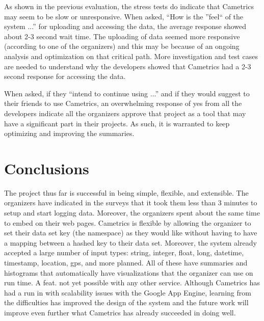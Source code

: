 \documentclass[10pt,a4paper,english]{article}
\begin{document}
As shown in the previous evaluation, the stress tests do indicate that Cametrics may seem to be slow or unresponsive. When asked, ``How is the ''feel`` of the system ...'' for uploading and accessing the data, the average response showed about 2-3 second wait time. The uploading of data seemed more responsive (according to one of the organizers) and this may be because of an ongoing analysis and optimization on that critical path. More investigation and test cases are needed to understand why the developers showed that Cametrics had a 2-3 second response for accessing the data.

When asked, if they ``intend to continue using ...'' and if they would suggest to their friends to use Cametrics, an overwhelming response of yes from all the developers indicate all the organizers approve that project as a tool that may have a significant part in their projects. As such, it is warranted to keep optimizing and improving the summaries.


\pagebreak{}




\hypertarget{conclusions}{}
\section*{Conclusions}
\label{conclusions}

The project thus far is successful in being simple, flexible, and extensible. The organizers have indicated in the surveys that it took them less than 3 minutes to setup and start logging data. Moreover, the organizers spent about the same time to embed on their web pages. Cametrics is flexible by allowing the organizer to set their data set key (the namespace) as they would like without having to have a mapping between a hashed key to their data set. Moreover, the system already accepted a large number of input types: string, integer, float, long, datetime, timestamp, location, gps, and more planned. All of these have summaries and histograms that automatically have visualizations that the organizer can use on run time. A feat. not yet possible with any other service. Although Cametrics has had a run in with scalability issues with the Google App Engine, learning from the difficulties has improved the design of the system and the future work will improve even further what Cametrics has already succeeded in doing well.
\end{document}
